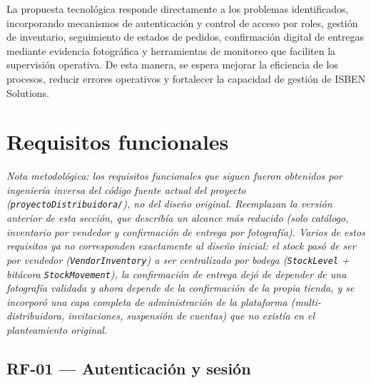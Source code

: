 \documentclass[12pt,a4paper]{report}
\begin{document}
La propuesta tecnológica responde directamente a los problemas identificados, incorporando mecanismos de autenticación y control de acceso por roles, gestión de inventario, seguimiento de estados de pedidos, confirmación digital de entregas mediante evidencia fotográfica y herramientas de monitoreo que faciliten la supervisión operativa. De esta manera, se espera mejorar la eficiencia de los procesos, reducir errores operativos y fortalecer la capacidad de gestión de ISBEN Solutions.



\section{Requisitos funcionales}

\textit{Nota metodológica: los requisitos funcionales que siguen fueron obtenidos por ingeniería inversa del código fuente actual del proyecto (\texttt{proyectoDistribuidora/}), no del diseño original. Reemplazan la versión anterior de esta sección, que describía un alcance más reducido (solo catálogo, inventario por vendedor y confirmación de entrega por fotografía). Varios de estos requisitos ya no corresponden exactamente al diseño inicial: el stock pasó de ser por vendedor (\texttt{VendorInventory}) a ser centralizado por bodega (\texttt{StockLevel} + bitácora \texttt{StockMovement}), la confirmación de entrega dejó de depender de una fotografía validada y ahora depende de la confirmación de la propia tienda, y se incorporó una capa completa de administración de la plataforma (multi-distribuidora, invitaciones, suspensión de cuentas) que no existía en el planteamiento original.}

\subsection{RF-01 --- Autenticación y sesión}
\end{document}
